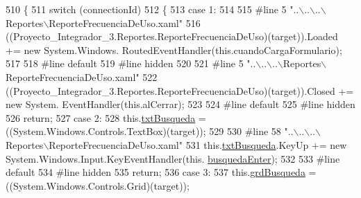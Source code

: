 \begin{DoxyCode}
510                                                                                                 \{
511             \textcolor{keywordflow}{switch} (connectionId)
512             \{
513             \textcolor{keywordflow}{case} 1:
514             
515 \textcolor{preprocessor}{            #line 5 "..\(\backslash\)..\(\backslash\)..\(\backslash\)Reportes\(\backslash\)ReporteFrecuenciaDeUso.xaml"}
516 \textcolor{preprocessor}{}            ((Proyecto\_Integrador\_3.Reportes.ReporteFrecuenciaDeUso)(target)).Loaded += \textcolor{keyword}{new} System.Windows.
      RoutedEventHandler(\textcolor{keyword}{this}.cuandoCargaFormulario);
517             
518 \textcolor{preprocessor}{            #line default}
519 \textcolor{preprocessor}{}\textcolor{preprocessor}{            #line hidden}
520 \textcolor{preprocessor}{}            
521 \textcolor{preprocessor}{            #line 5 "..\(\backslash\)..\(\backslash\)..\(\backslash\)Reportes\(\backslash\)ReporteFrecuenciaDeUso.xaml"}
522 \textcolor{preprocessor}{}            ((Proyecto\_Integrador\_3.Reportes.ReporteFrecuenciaDeUso)(target)).Closed += \textcolor{keyword}{new} System.
      EventHandler(\textcolor{keyword}{this}.alCerrar);
523             
524 \textcolor{preprocessor}{            #line default}
525 \textcolor{preprocessor}{}\textcolor{preprocessor}{            #line hidden}
526 \textcolor{preprocessor}{}            \textcolor{keywordflow}{return};
527             \textcolor{keywordflow}{case} 2:
528             this.\hyperlink{class_proyecto___integrador__3_1_1_reportes_1_1_reporte_frecuencia_de_uso_a6f91eb77ee76d84a4dbf8eaedb2d8497}{txtBusqueda} = ((System.Windows.Controls.TextBox)(target));
529             
530 \textcolor{preprocessor}{            #line 58 "..\(\backslash\)..\(\backslash\)..\(\backslash\)Reportes\(\backslash\)ReporteFrecuenciaDeUso.xaml"}
531 \textcolor{preprocessor}{}            this.\hyperlink{class_proyecto___integrador__3_1_1_reportes_1_1_reporte_frecuencia_de_uso_a6f91eb77ee76d84a4dbf8eaedb2d8497}{txtBusqueda}.KeyUp += \textcolor{keyword}{new} System.Windows.Input.KeyEventHandler(this.
      \hyperlink{class_proyecto___integrador__3_1_1_reportes_1_1_reporte_frecuencia_de_uso_aabe66d19df09b28ab8f1c034935091c0}{busquedaEnter});
532             
533 \textcolor{preprocessor}{            #line default}
534 \textcolor{preprocessor}{}\textcolor{preprocessor}{            #line hidden}
535 \textcolor{preprocessor}{}            \textcolor{keywordflow}{return};
536             \textcolor{keywordflow}{case} 3:
537             this.\hyperlink{class_proyecto___integrador__3_1_1_reportes_1_1_reporte_frecuencia_de_uso_af86d8cdcb91a2f6d6954bf44f4ad2b6c}{grdBusqueda} = ((System.Windows.Controls.Grid)(target));

\end{DoxyCode}
